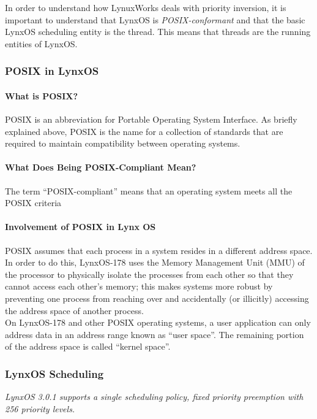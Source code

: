 \documentclass[12pt]{article}
\begin{document}
In order to understand how LynuxWorks deals with priority inversion, it is important to
understand that LynxOS is \emph{POSIX-conformant} and that the basic LynxOS scheduling
entity is the thread. This means that threads are the running entities of LynxOS. 

\subsubsection{POSIX in LynxOS}

\paragraph{What is POSIX?} 
POSIX is an abbreviation for Portable Operating System Interface. As briefly explained above, POSIX is the name for a collection of standards that are required to maintain compatibility between operating systems.

\paragraph{What Does Being POSIX-Compliant Mean?} 
The term “POSIX-compliant” means that an operating system meets all the POSIX criteria


\paragraph{Involvement of POSIX in Lynx OS} 

POSIX assumes that each process in a system resides in a different address space.  In order to do this, LynxOS-178 uses the Memory Management Unit (MMU) of the processor to physically isolate the processes from each other so that they cannot access each other’s memory; this makes systems more robust by preventing one process from reaching over and accidentally (or illicitly) accessing the address space of another process.\\
On LynxOS-178 and other POSIX operating systems, a user application can only address data in an address range known as “user space”.  The remaining portion of the address space is called “kernel space”. 




\subsubsection{LynxOS Scheduling}
\emph{LynxOS 3.0.1 supports a single scheduling policy, fixed priority preemption with 256 priority levels.}\cite{ref:nine} \\\\
\end{document}
